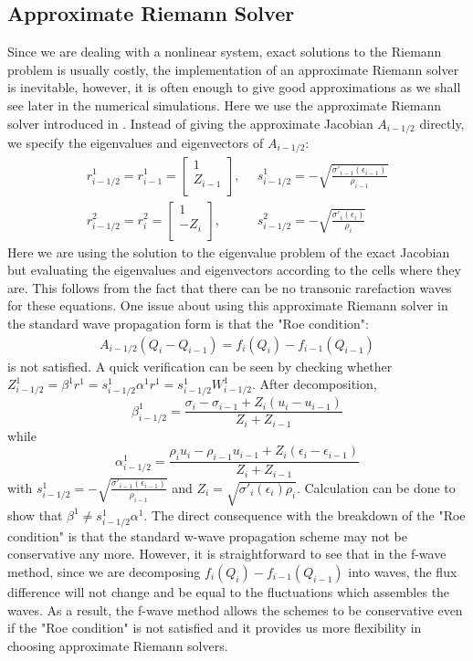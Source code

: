 \documentclass{article}
\begin{document}
\subsection{Approximate Riemann Solver}
Since we are dealing with a nonlinear system, exact solutions to the Riemann problem is usually costly, the implementation of an approximate Riemann solver is inevitable, however, it is often enough to give good approximations as we shall see later in the numerical simulations. Here we use the approximate Riemann solver introduced in \cite{leveque2003}. Instead of giving the approximate Jacobian $A_{i-1/2}$ directly, we specify the eigenvalues and eigenvectors of $A_{i-1/2}$:
\begin{align}
r^1_{i-1/2}=r^1_{i-1}=\left[
                        \begin{array}{c}
                          1 \\ Z_{i-1} \\
                        \end{array}
                      \right], & \,\,\, s^1_{i-1/2}=-\sqrt{\frac{\sigma'_{i-1}(\epsilon_{i-1})}{\rho_{i-1}}}\\
r^2_{i-1/2}=r^2_{i}=\left[
                        \begin{array}{c}
                          1 \\ -Z_{i} \\
                        \end{array}
                      \right], &\,\,\, s^2_{i-1/2}=-\sqrt{\frac{\sigma'_{i}(\epsilon_{i})}{\rho_{i}}}
\end{align}
Here we are using the solution to the eigenvalue problem of the exact Jacobian but evaluating the eigenvalues and eigenvectors according to the cells where they are. This follows from the fact that there can be no transonic rarefaction waves for these equations. One issue about using this approximate Riemann solver in the standard wave propagation form is that the "Roe condition":
\begin{align}
A_{i-1/2}(Q_i-Q_{i-1})=f_{i}(Q_i)-f_{i-1}(Q_{i-1})
\end{align}
is not satisfied.
A quick verification can be seen by checking whether $Z^1_{i-1/2}=\beta^1 r^1=s^1_{i-1/2} \alpha^1r^1=s^1_{i-1/2}W^1_{i-1/2}$. After decomposition,
\[
\beta^1_{i-1/2}=\frac{\sigma_i-\sigma_{i-1}+Z_i(u_i-u_{i-1})}{Z_i+Z_{i-1}}
\]
while
\[
\alpha^1_{i-1/2}=\frac{\rho_i u_i-\rho_{i-1}u_{i-1}+Z_i(\epsilon_i-\epsilon_{i-1})}{Z_i+Z_{i-1}}
\]
with $s^1_{i-1/2}=-\sqrt{\frac{\sigma'_{i-1}(\epsilon_{i-1})}{\rho_{i-1}}}$
and $Z_i=\sqrt{\sigma'_{i}(\epsilon_{i})\rho_{i}}$. Calculation can be done to show that $ \beta^1 \neq s^1_{i-1/2} \alpha^1$. The direct consequence with the breakdown of the "Roe condition" is that the standard w-wave propagation scheme may not be conservative any more. However, it is straightforward to see that in the f-wave method, since we are decomposing $f_{i}(Q_i)-f_{i-1}(Q_{i-1})$ into waves, the flux difference will not change and be equal to the fluctuations which assembles the waves. As a result, the f-wave method allows the schemes to be conservative even if the "Roe condition" is not satisfied and it provides us more flexibility in choosing approximate Riemann solvers.
\end{document}
